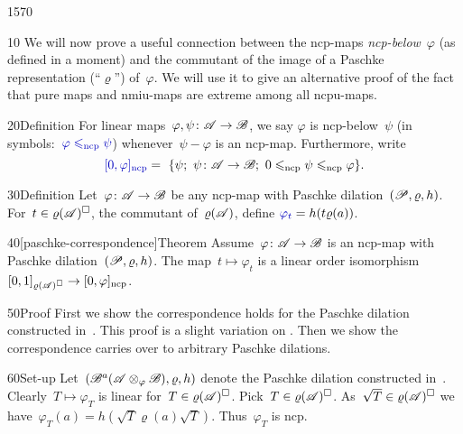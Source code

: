 \begin{parsec}{1570}%
\begin{point}{10}%
We will now prove a useful connection between
    the ncp-maps \emph{ncp-below}~$\varphi$ (as defined in a moment)
    and the commutant of the image
    of a Paschke representation (``$\varrho$'') of~$\varphi$.
We will use it to give an alternative proof
    of the fact that pure maps and nmiu-maps
    are extreme among all ncpu-maps.
\end{point}
\begin{point}{20}{Definition}%
For linear  maps~$\varphi, \psi\colon \mathscr{A} \to \mathscr{B}$,
    we say $\varphi$ is ncp-below~$\psi$
    (in symbols:~$\Define{\varphi \mathrel{\leq_\ncp} \psi}$\index{$\leq_\ncp$})
    whenever~$\psi - \varphi$ is an ncp-map.
    Furthermore, write
    \begin{equation*}
        \Define{[0,\varphi]_\ncp}\index{$[0,\varphi]_\ncp$} =\  
        \{\psi; \ \psi \colon \scrA \to \scrB;
            \ 0 \leq_\ncp\psi \leq_\ncp \varphi \}.
    \end{equation*}
\end{point}
\begin{point}{30}{Definition}%
    Let~$\varphi\colon \mathscr{A} \to \mathscr{B}$ be any ncp-map with Paschke
        dilation~$(\mathscr{P}, \varrho, h)$.
        For~$t \in \varrho(\mathscr{A})^\square$, the commutant of~$\varrho(\mathscr{A})$,
        define $\Define{\varphi_t}\index{$\varphi_t$} = h(t \varrho(a))$.
\end{point}
\begin{point}{40}[paschke-correspondence]{Theorem}%
Assume~$\varphi\colon \mathscr{A} \to \mathscr{B}$ is an ncp-map
    with Paschke dilation~$(\mathscr{P}, \varrho, h)$.
The map~$t \mapsto \varphi_t$ is a linear
order isomorphism~$[0,1]_{\varrho(\mathscr{A})^\square} \to [0,\varphi]_{\mathrm{ncp}}$.
\begin{point}{50}{Proof}
First we show the correspondence holds
    for the Paschke dilation constructed in~.
This proof is a slight variation on \cite[Prop.~5.4]{paschke}.
Then we show the correspondence carries over to arbitrary Paschke dilations.
\begin{point}{60}{Set-up}%
Let~$(\mathscr{B}^a(\mathscr{A} \otimes_\varphi \mathscr{B}), \varrho, h)$
    denote the Paschke dilation constructed in~.
Clearly~$T \mapsto \varphi_T$ is linear
    for~$T \in \varrho(\mathscr{A})^\square$.
Pick~$T \in \varrho(\mathscr{A})^\square$.
As~$\sqrt{T} \in \varrho(\mathscr{A})^\square$
    we have~$\varphi_T(a) = h(\sqrt{T} \varrho(a)\sqrt{T})$.
    Thus~$\varphi_T$ is ncp.

\end{point}
\end{point}
\end{point}
\end{parsec}
